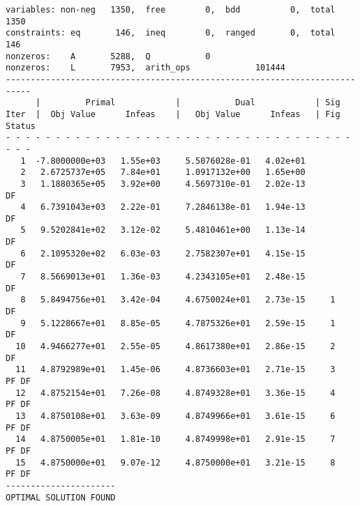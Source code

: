 \begin{slide}
\vfill
{
\scriptsize
\begin{verbatim}
variables: non-neg   1350,  free        0,  bdd          0,  total     1350
constraints: eq       146,  ineq        0,  ranged       0,  total      146
nonzeros:    A       5288,  Q           0
nonzeros:    L       7953,  arith_ops             101444
---------------------------------------------------------------------------
      |         Primal            |           Dual            | Sig        
Iter  |  Obj Value      Infeas    |   Obj Value      Infeas   | Fig  Status
- - - - - - - - - - - - - - - - - - - - - - - - - - - - - - - - - - - - - -
   1  -7.8000000e+03   1.55e+03     5.5076028e-01   4.02e+01               
   2   2.6725737e+05   7.84e+01     1.0917132e+00   1.65e+00               
   3   1.1880365e+05   3.92e+00     4.5697310e-01   2.02e-13             DF
   4   6.7391043e+03   2.22e-01     7.2846138e-01   1.94e-13             DF
   5   9.5202841e+02   3.12e-02     5.4810461e+00   1.13e-14             DF
   6   2.1095320e+02   6.03e-03     2.7582307e+01   4.15e-15             DF
   7   8.5669013e+01   1.36e-03     4.2343105e+01   2.48e-15             DF
   8   5.8494756e+01   3.42e-04     4.6750024e+01   2.73e-15     1       DF
   9   5.1228667e+01   8.85e-05     4.7875326e+01   2.59e-15     1       DF
  10   4.9466277e+01   2.55e-05     4.8617380e+01   2.86e-15     2       DF
  11   4.8792989e+01   1.45e-06     4.8736603e+01   2.71e-15     3    PF DF
  12   4.8752154e+01   7.26e-08     4.8749328e+01   3.36e-15     4    PF DF
  13   4.8750108e+01   3.63e-09     4.8749966e+01   3.61e-15     6    PF DF
  14   4.8750005e+01   1.81e-10     4.8749998e+01   2.91e-15     7    PF DF
  15   4.8750000e+01   9.07e-12     4.8750000e+01   3.21e-15     8    PF DF
----------------------
OPTIMAL SOLUTION FOUND
\end{verbatim}
}

\vfill 
\end{slide}

